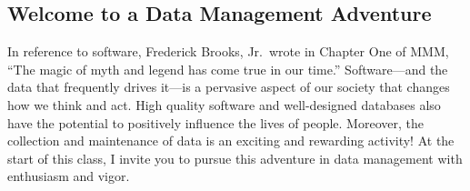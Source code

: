 \subsection*{Welcome to a Data Management Adventure}

In reference to software, Frederick Brooks, Jr.\ wrote in Chapter One of MMM, ``The magic of myth and legend has come
true in our time.'' Software---and the data that frequently drives it---is a pervasive aspect of our society that
changes how we think and act.  High quality software and well-designed databases also have the potential to positively
influence the lives of people. Moreover, the collection and maintenance of data is an exciting and rewarding activity!
At the start of this class, I invite you to pursue this adventure in data management with enthusiasm and vigor.


